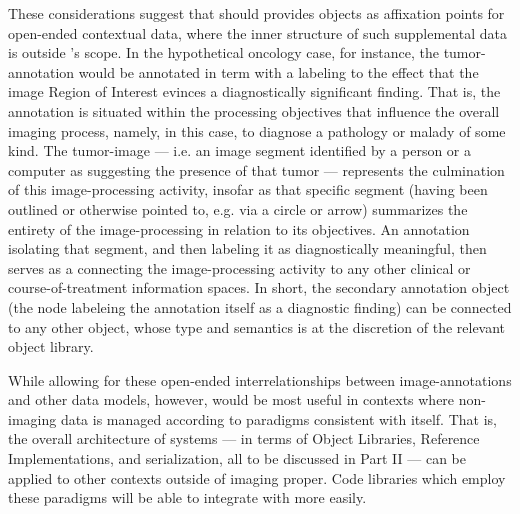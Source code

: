 {\begin{description}
These considerations suggest that \AXFI{} 
should provides objects as affixation 
points for open-ended contextual 
data, where the inner structure of such 
supplemental data is outside \AXFI{}'s 
scope.  In the hypothetical oncology 
case, for instance, the tumor-annotation 
would be annotated in term with a labeling 
to the effect that the image Region of 
Interest evinces a diagnostically significant 
finding.  That is, the annotation is situated 
within the processing objectives that 
influence the overall imaging process, namely, 
in this case, to diagnose a pathology or 
malady of some kind.  The tumor-image --- 
i.e. an image segment identified by a person 
or a computer as suggesting the presence of that  
tumor --- represents the culmination of this 
image-processing activity, insofar as that 
specific segment (having been outlined or 
otherwise pointed to, e.g. via a circle or 
arrow) summarizes the entirety of the 
image-processing in relation to its 
objectives.  An annotation isolating that 
segment, and then labeling it as 
diagnostically meaningful, then serves as a 
 connecting the image-processing 
activity to any other clinical or course-of-treatment 
information spaces.  In short, the secondary 
annotation object (the node labeleing the 
annotation itself as a diagnostic finding) 
can be connected to any other object, whose 
type and semantics is at the discretion 
of the relevant \AXFI{} object library.

While allowing for these open-ended interrelationships 
between image-annotations and other data models, 
however, \AXFI{} would be most useful in contexts 
where non-imaging data is managed according to paradigms 
consistent with \AXFI{} itself.   That is, the 
overall architecture of \AXFI{} systems --- in terms 
of \AXFI{} Object Libraries, Reference Implementations, 
and  serialization, all to be 
discussed in Part II --- can be applied to 
other contexts outside of imaging proper.  
Code libraries which employ these paradigms 
will be able to integrate with \AXFI{} more easily. 
\end{description}
}







